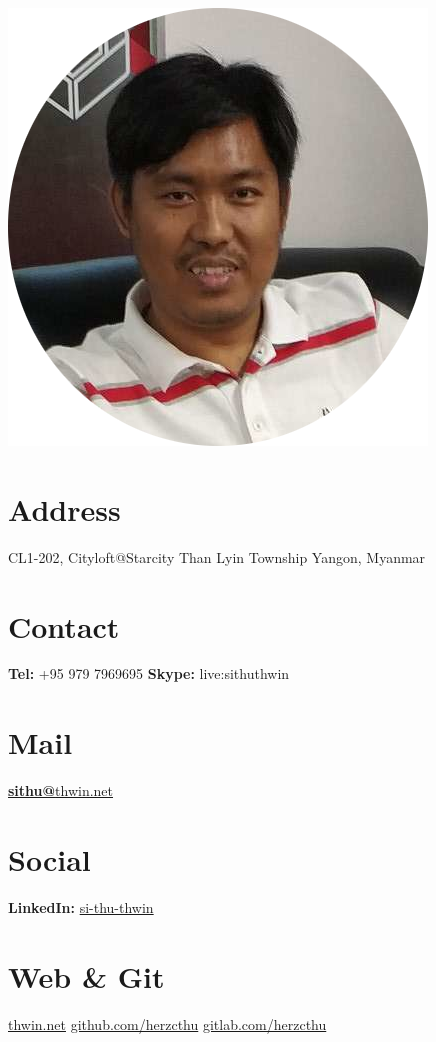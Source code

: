 \documentclass[]{friggeri-cv}
\begin{document}
\begin{aside}
  \includegraphics[scale=1]{img/myself-circle.png}
  \section{Address}
    CL1-202, Cityloft@Starcity
    Than Lyin Township
    Yangon, Myanmar
    ~
  \section{Contact}
    \textbf{Tel:} +95 979 7969695
    \textbf{Skype:} live:sithuthwin
    ~
  \section{Mail}
    \href{mailto:sithu@thwin.net}{\textbf{sithu@}thwin.net}
    ~
  \section{Social}
    \textbf{LinkedIn:} \href{https://www.linkedin.com/in/si-thu-thwin/}{si-thu-thwin}
    ~
  \section{Web \& Git}
    \href{https://www.thwin.net}{thwin.net}
    \href{https://github.com/herzcthu}{github.com/herzcthu}
    \href{https://gitlab.com/herzcthu}{gitlab.com/herzcthu}
    ~

\end{aside}
\end{document}
